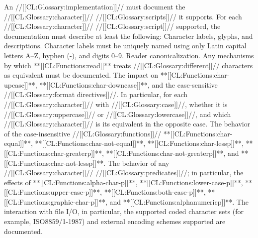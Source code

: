 \endsubSection%


 

   An //[[CL:Glossary:implementation]]// must document the //[[CL:Glossary:character]]// //[[CL:Glossary:scripts]]// 
   it supports. For each //[[CL:Glossary:character]]// //[[CL:Glossary:script]]// supported,
   the documentation must describe at least the following: \beginlist \itemitem{\bull}
   Character labels, glyphs, and descriptions.
   Character labels must be uniquely named using only Latin capital letters A--Z,
   hyphen (-), and digits 0--9. \itemitem{\bull}
   Reader canonicalization.
   Any mechanisms by which **[[CL:Functions:read]]** treats
   //[[CL:Glossary:different]]// characters as equivalent must be documented. \itemitem{\bull}
   The impact on **[[CL:Functions:char-upcase]]**, 		 **[[CL:Functions:char-downcase]]**, 	     and the case-sensitive //[[CL:Glossary:format directives]]//.
   In particular, for each //[[CL:Glossary:character]]// with //[[CL:Glossary:case]]//,
   whether it is //[[CL:Glossary:uppercase]]// or //[[CL:Glossary:lowercase]]//,
   and which //[[CL:Glossary:character]]// is its equivalent in the opposite case. \itemitem{\bull}
   The behavior of the case-insensitive //[[CL:Glossary:functions]]//
     **[[CL:Functions:char-equal]]**, **[[CL:Functions:char-not-equal]]**,
     **[[CL:Functions:char-lessp]]**, **[[CL:Functions:char-greaterp]]**, 
     **[[CL:Functions:char-not-greaterp]]**, and **[[CL:Functions:char-not-lessp]]**. \itemitem{\bull}
   The behavior of any //[[CL:Glossary:character]]// //[[CL:Glossary:predicates]]//;
   in particular, the effects of
   **[[CL:Functions:alpha-char-p]]**,
   **[[CL:Functions:lower-case-p]]**,
   **[[CL:Functions:upper-case-p]]**,
   **[[CL:Functions:both-case-p]]**,
   **[[CL:Functions:graphic-char-p]]**, 
   and
   **[[CL:Functions:alphanumericp]]**. \itemitem{\bull}
   The interaction with file I/O, in particular,
   the supported coded character sets (for example, ISO8859/1-1987)
   and external encoding schemes supported are documented. \endlist

\endsubsection%
